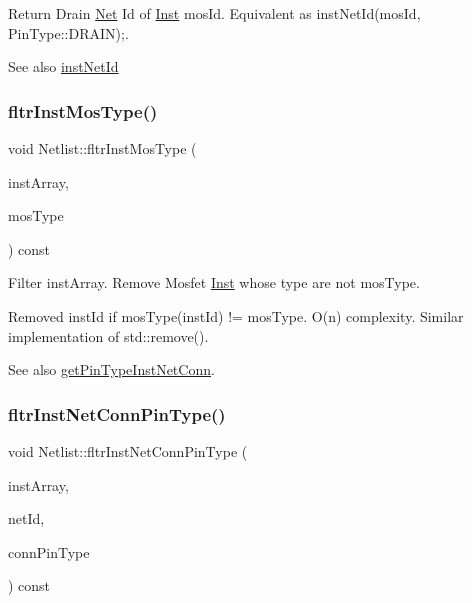Return Drain \hyperlink{classNet}{Net} Id of \hyperlink{classInst}{Inst} mos\+Id. Equivalent as inst\+Net\+Id(mos\+Id, Pin\+Type\+::\+D\+R\+A\+I\+N);. 

\begin{DoxySeeAlso}{See also}
\hyperlink{classNetlist_af7ac6daa5f0f66a60c71b69a1d8fd670}{inst\+Net\+Id} 
\end{DoxySeeAlso}
\mbox{\label{classNetlist_a5efc5375bb3c58e71e068278eadb4764}} 
\subsubsection{\texorpdfstring{fltr\+Inst\+Mos\+Type()}{fltrInstMosType()}}
{\footnotesize\ttfamily void Netlist\+::fltr\+Inst\+Mos\+Type (\begin{DoxyParamCaption}\item[{std\+::vector$<$ \hyperlink{type_8h_a581e8093e28e7362f2b6937296190676}{Index\+Type} $>$ \&}]{inst\+Array,  }\item[{\hyperlink{type_8h_a34a6a66323cfecf83dfe00bc8fd96333}{Mos\+Type}}]{mos\+Type }\end{DoxyParamCaption}) const}



Filter inst\+Array. Remove Mosfet \hyperlink{classInst}{Inst} whose type are not mos\+Type. 

Removed inst\+Id if mos\+Type(inst\+Id) != mos\+Type. O(n) complexity. Similar implementation of std\+::remove().

\begin{DoxySeeAlso}{See also}
\hyperlink{classNetlist_a6bc6f9666ed8c833b967c38f2e164a1e}{get\+Pin\+Type\+Inst\+Net\+Conn}. 
\end{DoxySeeAlso}
\mbox{\label{classNetlist_a525b81a4d2bba3c381c9d76be91acba8}} 
\subsubsection{\texorpdfstring{fltr\+Inst\+Net\+Conn\+Pin\+Type()}{fltrInstNetConnPinType()}}
{\footnotesize\ttfamily void Netlist\+::fltr\+Inst\+Net\+Conn\+Pin\+Type (\begin{DoxyParamCaption}\item[{std\+::vector$<$ \hyperlink{type_8h_a581e8093e28e7362f2b6937296190676}{Index\+Type} $>$ \&}]{inst\+Array,  }\item[{\hyperlink{type_8h_a581e8093e28e7362f2b6937296190676}{Index\+Type}}]{net\+Id,  }\item[{\hyperlink{type_8h_afaab50027002ecbb6c8ac27e727d1bb4}{Pin\+Type}}]{conn\+Pin\+Type }\end{DoxyParamCaption}) const}



